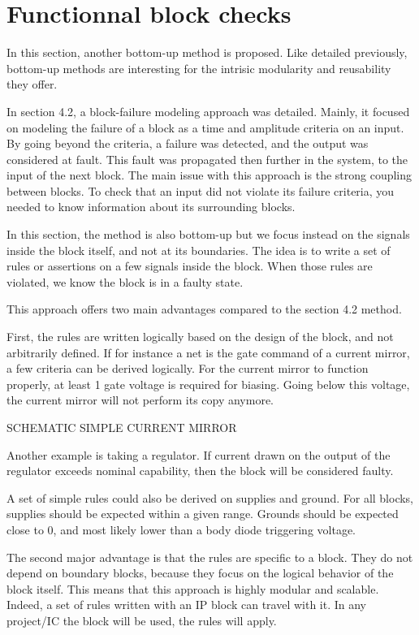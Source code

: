 \section{Functionnal block checks}

In this section, another bottom-up method is proposed.
Like detailed previously, bottom-up methods are interesting for the intrisic modularity and reusability they offer.

In section 4.2, a block-failure modeling approach was detailed.
Mainly, it focused on modeling the failure of a block as a time and amplitude criteria on an input.
By going beyond the criteria, a failure was detected, and the output was considered at fault.
This fault was propagated then further in the system, to the input of the next block.
The main issue with this approach is the strong coupling between blocks.
To check that an input did not violate its failure criteria, you needed to know information about its surrounding blocks.

In this section, the method is also bottom-up but we focus instead on the signals inside the block itself, and not at its boundaries.
The idea is to write a set of rules or assertions on a few signals inside the block.
When those rules are violated, we know the block is in a faulty state.

This approach offers two main advantages compared to the section 4.2 method.

First, the rules are written logically based on the design of the block, and not arbitrarily defined.
If for instance a net is the gate command of a current mirror, a few criteria can be derived logically.
For the current mirror to function properly, at least 1 gate voltage is required for biasing.
Going below this voltage, the current mirror will not perform its copy anymore.

SCHEMATIC SIMPLE CURRENT MIRROR

Another example is taking a regulator.
If current drawn on the output of the regulator exceeds nominal capability, then the block will be considered faulty.

A set of simple rules could also be derived on supplies and ground.
For all blocks, supplies should be expected within a given range.
Grounds should be expected close to 0, and most likely lower than a body diode triggering voltage.

The second major advantage is that the rules are specific to a block.
They do not depend on boundary blocks, because they focus on the logical behavior of the block itself.
This means that this approach is highly modular and scalable.
Indeed, a set of rules written with an IP block can travel with it.
In any project/IC the block will be used, the rules will apply.

